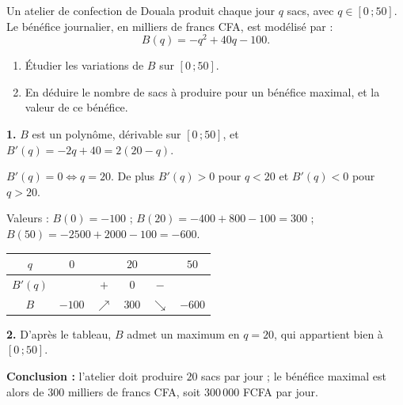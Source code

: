 \documentclass[11pt]{article}
\begin{document}
\begin{exoresolu}
Un atelier de confection de Douala produit chaque jour $q$ sacs, avec $q\in[0\,;50]$. Le bénéfice journalier, en milliers de francs CFA, est modélisé par :
\[B(q)=-q^{2}+40q-100.\]
\begin{enumerate}
\item Étudier les variations de $B$ sur $[0\,;50]$.
\item En déduire le nombre de sacs à produire pour un bénéfice maximal, et la valeur de ce bénéfice.
\end{enumerate}
\tcblower
\textbf{1.} $B$ est un polynôme, dérivable sur $[0\,;50]$, et $B'(q)=-2q+40=2(20-q)$.

$B'(q)=0 \iff q=20$. De plus $B'(q)>0$ pour $q<20$ et $B'(q)<0$ pour $q>20$.

Valeurs : $B(0)=-100$ ; $B(20)=-400+800-100=300$ ; $B(50)=-2500+2000-100=-600$.
\begin{center}
\begin{tabular}{|c|ccccc|}\hline
$q$ & $0$ & & $20$ & & $50$ \\ \hline
$B'(q)$ & & $+$ & $0$ & $-$ & \\ \hline
$B$ & $-100$ & $\nearrow$ & $300$ & $\searrow$ & $-600$ \\ \hline
\end{tabular}
\end{center}

\textbf{2.} D'après le tableau, $B$ admet un maximum en $q=20$, qui appartient bien à $[0\,;50]$.

\textbf{Conclusion :} l'atelier doit produire $20$ sacs par jour ; le bénéfice maximal est alors de $300$ milliers de francs CFA, soit $300\,000$ FCFA par jour.
\end{exoresolu}
\end{document}

